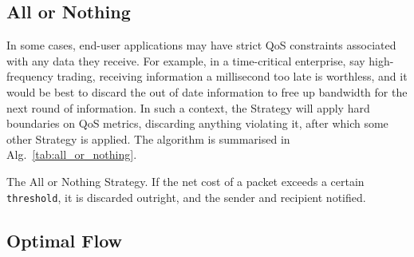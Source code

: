 \documentclass[aps,rmp,twocolumn,amsmath,amssymb,nofootinbib,superscriptaddress]{revtex4}
\begin{document}
%
%

\subsection{All or Nothing} \label{sec:all_or_nothing}

In some cases, end-user applications may have strict QoS constraints associated with any data they receive. For example, in a time-critical enterprise, say high-frequency trading, receiving information a millisecond too late is worthless, and it would be best to discard the out of date information to free up bandwidth for the next round of information. In such a context, the {\sc Strategy} will apply hard boundaries on QoS metrics, discarding anything violating it, after which some other {\sc Strategy} is applied. The algorithm is summarised in Alg.~\ref{tab:all_or_nothing}.

\begin{table}[!htb]
\caption{The {\sc All or Nothing Strategy}. If the net cost of a packet exceeds a certain {\tt threshold}, it is discarded outright, and the sender and recipient notified.} \label{tab:all_or_nothing}
\end{table}

%
%

\subsection{Optimal Flow}
\end{document}
